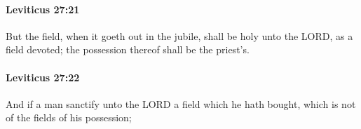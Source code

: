 		\paragraph{Leviticus 27:21} %
			\label{LEVITICUS-27-21}

			But the field, when it goeth out in the jubile, shall be holy unto the LORD, as a field devoted; the possession thereof shall be the priest’s.


		\paragraph{Leviticus 27:22} %
			\label{LEVITICUS-27-22}

			And if a man sanctify unto the LORD a field which he hath bought, which is not of the fields of his possession;


